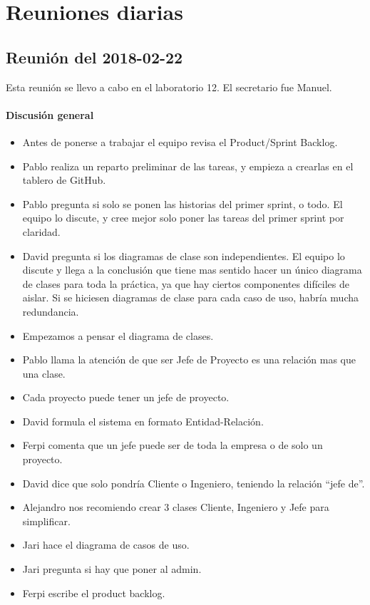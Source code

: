 \documentclass[a4paper, 12pt, spanish]{memoria}
\begin{document}

\section*{Reuniones diarias}

\subsection*{Reunión del 2018-02-22}
Esta reunión se llevo a cabo en el laboratorio 12. El secretario fue Manuel.

\paragraph{Discusión general}
\begin{itemize}
\item Antes de ponerse a trabajar el equipo revisa el Product/Sprint Backlog.
\item Pablo realiza un reparto preliminar de las tareas, y empieza a crearlas en el tablero de GitHub.
\item Pablo pregunta si solo se ponen las historias del primer sprint, o todo. El equipo lo discute, y cree mejor solo poner las tareas del primer sprint por claridad.
\item David pregunta si los diagramas de clase son independientes. El equipo lo discute y llega a la conclusión que tiene mas sentido hacer un único diagrama de clases para toda la práctica, ya que hay ciertos componentes difíciles de aislar. Si se hiciesen diagramas de clase para cada caso de uso, habría mucha redundancia.
\item Empezamos a pensar el diagrama de clases.
\item Pablo llama la atención de que ser Jefe de Proyecto es una relación mas que una clase.
\item Cada proyecto puede tener un jefe de proyecto.
\item David formula el sistema en formato Entidad-Relación.
\item Ferpi comenta que un jefe puede ser de toda la empresa o de solo un proyecto.
\item David dice que solo pondría Cliente o Ingeniero, teniendo la relación ``jefe de''.
\item Alejandro nos recomiendo crear 3 clases Cliente, Ingeniero y Jefe para simplificar.
\item Jari hace el diagrama de casos de uso.
\item Jari pregunta si hay que poner al admin.
\item Ferpi escribe el product backlog.
\end{itemize}
\end{document}

